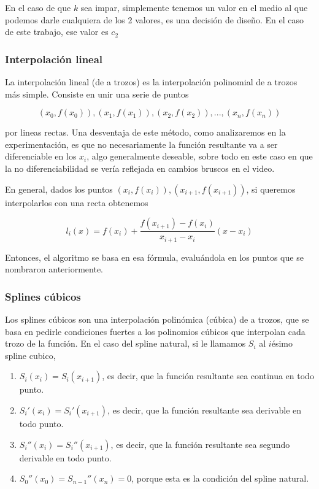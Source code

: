 En el caso de que $k$ sea impar, simplemente tenemos un valor en el medio al que podemos darle cualquiera de los 2 valores, es una decisión de diseño. En el caso de este trabajo, ese valor es $c_2$


\subsubsection{Interpolación lineal}

La interpolación lineal (de a trozos) es la interpolación polinomial de a trozos más simple. Consiste en unir una serie de puntos

\[ (x_0, f(x_0)), (x_1, f(x_1)), (x_2, f(x_2)), ..., (x_n, f(x_n)) \]

por lineas rectas. Una desventaja de este método, como analizaremos en la experimentación, es que no necesariamente la función resultante va a ser diferenciable en los $x_i$, algo generalmente deseable, sobre todo en este caso en que la no diferenciabilidad se vería reflejada en cambios bruscos en el video.

En general, dados los puntos $(x_i, f(x_i)), (x_{i+1}, f(x_{i+1}))$, si queremos interpolarlos con una recta obtenemos

\[ l_i(x) = f(x_i) + \frac{f(x_{i+1}) - f(x_i)}{x_{i+1} - x_i} (x - x_i) \]

Entonces, el algoritmo se basa en esa fórmula, evaluándola en los puntos que se nombraron anteriormente.

\subsubsection{Splines cúbicos}

Los splines cúbicos son una interpolación polinómica (cúbica) de a trozos, que se basa en pedirle condiciones fuertes a los polinomios cúbicos que interpolan cada trozo de la función. En el caso del spline natural, si le llamamos $S_i$ al $i$ésimo spline cubico,

\begin{enumerate}
    \item $S_i(x_i) = S_i(x_{i+1})$, es decir, que la función resultante sea continua en todo punto.
    \item $S_i'(x_i) = S_i'(x_{i+1})$, es decir, que la función resultante sea derivable en todo punto.
    \item $S_i''(x_i) = S_i''(x_{i+1})$, es decir, que la función resultante sea segundo derivable en todo punto.
    \item $S_0''(x_0) = S_{n-1}''(x_n) = 0$, porque esta es la condición del spline natural.
\end{enumerate}

